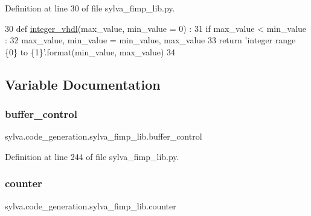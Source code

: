 Definition at line 30 of file sylva\+\_\+fimp\+\_\+lib.\+py.


\begin{DoxyCode}
30 \textcolor{keyword}{def }\hyperlink{namespacesylva_1_1code__generation_1_1sylva__fimp__lib_acdc15946f5f6a217b6075944dbbd5f59}{integer\_vhdl}(max\_value, min\_value = 0) :
31   \textcolor{keywordflow}{if} max\_value < min\_value :
32     max\_value, min\_value = min\_value, max\_value
33   \textcolor{keywordflow}{return} \textcolor{stringliteral}{'integer range \{0\} to \{1\}'}.format(min\_value, max\_value)
34 
\end{DoxyCode}


\subsection{Variable Documentation}
\mbox{\label{namespacesylva_1_1code__generation_1_1sylva__fimp__lib_a9f1e1b1e1118dcbfe55055475a342229}} 
\subsubsection{\texorpdfstring{buffer\+\_\+control}{buffer\_control}}
{\footnotesize\ttfamily sylva.\+code\+\_\+generation.\+sylva\+\_\+fimp\+\_\+lib.\+buffer\+\_\+control}



Definition at line 244 of file sylva\+\_\+fimp\+\_\+lib.\+py.

\mbox{\label{namespacesylva_1_1code__generation_1_1sylva__fimp__lib_af6787c82713f43b5d369232721d15a2e}} 
\subsubsection{\texorpdfstring{counter}{counter}}
{\footnotesize\ttfamily sylva.\+code\+\_\+generation.\+sylva\+\_\+fimp\+\_\+lib.\+counter}



